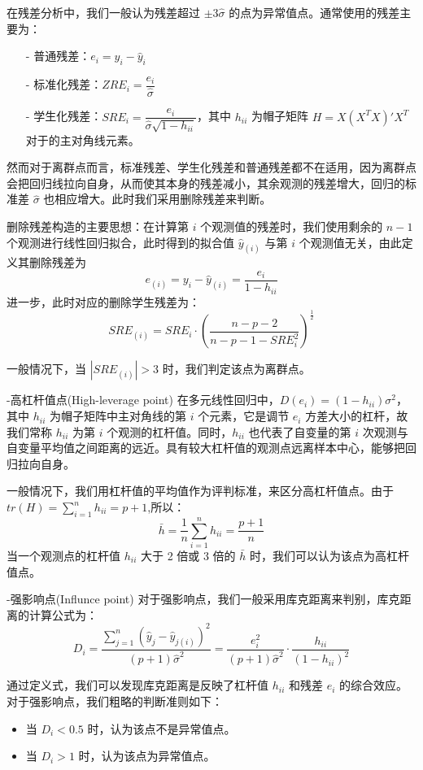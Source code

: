 \documentclass[11pt]{article}
\begin{document}
在残差分析中，我们一般认为残差超过 $\pm3\hat{\sigma}$ 的点为异常值点。通常使用的残差主要为：

\begin{itemize}
    \item [-] 普通残差：$e_i=y_i-\hat{y}_i$
    \item [-] 标准化残差：$ZRE_i=\dfrac{e_i}{\hat{\sigma}}$
    \item [-] 学生化残差：$SRE_i=\dfrac{e_i}{\hat{\sigma}\sqrt{1-h_{ii}}}$，其中 $h_{ii}$ 为帽子矩阵 $H=X(X^TX)'X^T$ 对于的主对角线元素。
\end{itemize}

然而对于离群点而言，标准残差、学生化残差和普通残差都不在适用，因为离群点会把回归线拉向自身，从而使其本身的残差减小，其余观测的残差增大，回归的标准差 $\hat{\sigma}$ 也相应增大。此时我们采用删除残差来判断。

删除残差构造的主要思想：在计算第 $i$ 个观测值的残差时，我们使用剩余的 $n-1$ 个观测进行线性回归拟合，此时得到的拟合值 $\hat{y}_{(i)}$ 与第 $i$ 个观测值无关，由此定义其删除残差为
$$
e_{(i)}=y_i-\hat{y}_{(i)}=\dfrac{e_i}{1-h_{ii}}
$$
进一步，此时对应的删除学生残差为：
$$
SRE_{(i)}=SRE_i\cdot(\dfrac{n-p-2}{n-p-1-SRE_i^2})^{\frac{1}{2}}
$$

一般情况下，当 $|SRE_{(i)}|>3$ 时，我们判定该点为离群点。

-高杠杆值点(High-leverage point)
在多元线性回归中，$D(e_i)=(1-h_{ii})\sigma^2$，其中 $h_{ii}$ 为帽子矩阵中主对角线的第 $i$ 个元素，它是调节 $e_i$ 方差大小的杠杆，故我们常称 $h_{ii}$ 为第 $i$ 个观测的杠杆值。同时，$h_{ii}$ 也代表了自变量的第 $i$ 次观测与自变量平均值之间距离的远近。具有较大杠杆值的观测点远离样本中心，能够把回归拉向自身。

一般情况下，我们用杠杆值的平均值作为评判标准，来区分高杠杆值点。由于 $tr(H)=\sum\limits_{i=1}^nh_{ii}=p+1$,所以：
$$
\bar{h}=\dfrac{1}{n}\sum\limits_{i=1}^nh_{ii}=\dfrac{p+1}{n}
$$
当一个观测点的杠杆值 $h_{ii}$ 大于 2 倍或 3 倍的 $\bar{h}$ 时，我们可以认为该点为高杠杆值点。

-强影响点(Influnce point)
对于强影响点，我们一般采用库克距离来判别，库克距离的计算公式为：
$$
D_i=\dfrac{\sum\limits_{j=1}^n(\hat{y}_j-\hat{y}_{j(i)})^2}{(p+1)\hat{\sigma}^2}=\dfrac{e_i^2}{(p+1)\hat{\sigma}^2}\cdot\dfrac{h_{ii}}{(1-h_{ii})^2}
$$

通过定义式，我们可以发现库克距离是反映了杠杆值 $h_{ii}$ 和残差 $e_i$ 的综合效应。对于强影响点，我们粗略的判断准则如下：
\begin{itemize}
	\item 当 $D_i<0.5$ 时，认为该点不是异常值点。
	\item 当 $D_i>1$ 时，认为该点为异常值点。
\end{itemize}
\end{document}
